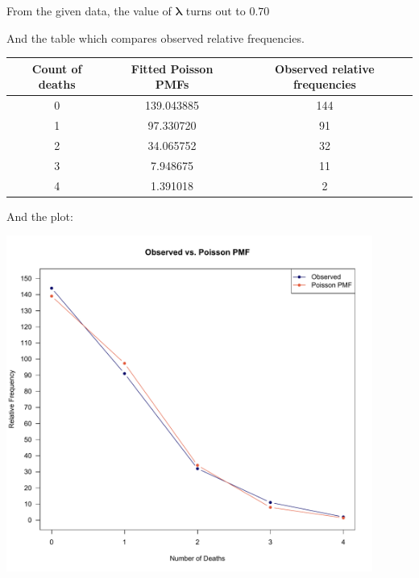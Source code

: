 \documentclass{article}
\begin{document}
From the given data, the value of $\mathbf{\lambda}$ turns out to $\mathbf{0.70}$
\bigskip

And the table which compares observed relative
frequencies.

\medskip
\begin{tabular}{*3c}\toprule
	\textbf{Count of deaths} & \textbf{Fitted Poisson PMFs} & \textbf{Observed relative frequencies}\\
	\midrule
	0 & 139.043885 & 144 \\
	1 & 97.330720 & 91 \\
	2 & 34.065752 & 32 \\
	3 & 7.948675 & 11 \\
	4 & 1.391018 & 2 \\
	\bottomrule
\end{tabular}
\bigskip

And the plot:
\vspace{-9pt}

\includegraphics[width=12cm]{Q2-plot.pdf}
\end{document}
